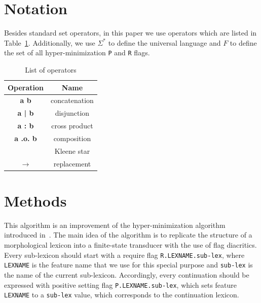 \documentclass[11pt]{article}
\begin{document}
\section{Notation}
\label{sec:notation}
Besides standard set operators, in this paper we use operators which are listed in Table~\ref{table:operators}. Additionally, 
we use $\Sigma^*$ to define the universal language and $F$ to define the set of all hyper-minimization \verb+P+ and \verb+R+ flags.


\begin{table}[h]
    \centering
    \begin{tabular}{|c|c|}
        \hline
        \bf Operation & \bf Name \\
        \hline\hline
        \bf a b & concatenation  \\
        \bf a | b & disjunction  \\
        \bf a : b & cross product  \\
        \bf a .o. b & composition  \\
        \bf * & Kleene star  \\
        \bf $\rightarrow$ & replacement \\
        \hline
    \end{tabular}
    \caption{List of operators
    \label{table:operators}}
\end{table}




\section{Methods}
\label{sec:methods}

This algorithm is an improvement of the hyper-minimization algorithm introduced in~. The main idea of the algorithm is to 
replicate the structure of a morphological lexicon into a finite-state transducer with the use of flag diacritics. Every sub-lexicon should start 
with a require flag \verb+R.LEXNAME.sub-lex+, where \verb+LEXNAME+ is the feature name that we use for this special purpose
and \verb+sub-lex+ is the name of the current sub-lexicon. Accordingly, every continuation should be expressed with positive setting flag 
\verb+P.LEXNAME.sub-lex+, which sets feature \verb+LEXNAME+ to a \verb+sub-lex+ value, which corresponds to the continuation lexicon.
\end{document}
